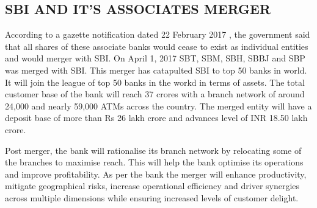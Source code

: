\documentclass[a4paper, 14pt]{article}
\begin{document}
{\subsection {SBI AND IT'S ASSOCIATES MERGER}
\par According to a gazette notification dated 22 February 2017 , the government said that all shares of these associate banks would cease to exist as individual entities and would merger with SBI. On April 1, 2017 SBT, SBM, SBH, SBBJ and SBP was merged with SBI. This merger has catapulted SBI to top 50 banks in world. It will join the league of top 50 banks in the workd in terms of assets. The total customer base of the bank will reach 37 crores with a branch network of around 24,000 and nearly 59,000 ATMs across the country. The merged entity will have a deposit base of more than Rs 26 lakh crore and advances level of INR 18.50 lakh crore.
\par Post merger, the bank will rationalise its branch network by relocating some of the branches to maximise reach. This will help the bank optimise its operations and improve profitability. As per the bank the merger will enhance productivity, mitigate geographical risks, increase operational efficiency and driver synergies across multiple dimensions while ensuring increased levels of customer delight.

}
\end{document}
